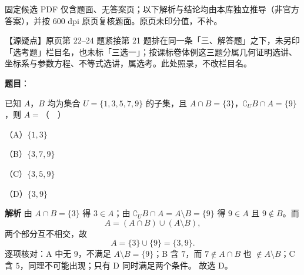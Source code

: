 \begin{gktip}
固定候选 PDF 仅含题面、无答案页；以下解析与结论均由本库独立推导（非官方答案），并按 600 dpi 原页复核题面。原页未印分值，不补。

【源疑点】原页第 22–24 题紧接第 21 题排在同一条「三、解答题」之下，未另印「选考题」栏目名，也未标「三选一」；按课标卷体例这三题分属几何证明选讲、坐标系与参数方程、不等式选讲，属选考。此处照录，不改栏目名。
\end{gktip}

\begin{answer}

\textbf{题目}：

已知 $A$，$B$ 均为集合 $U=\{1,3,5,7,9\}$ 的子集，且 $A\cap B=\{3\}$，$\complement_U B\cap A=\{9\}$，则 $A=$（　）

（A）$\{1,3\}$

（B）$\{3,7,9\}$

（C）$\{3,5,9\}$

（D）$\{3,9\}$

\textbf{解析}
由 $A\cap B=\{3\}$ 得 $3\in A$；由 $\complement_U B\cap A=A\setminus B=\{9\}$ 得 $9\in A$ 且 $9\notin B$。而
\nopagebreak[4]
\[A=(A\cap B)\cup(A\setminus B),\]
两个部分互不相交，故
\nopagebreak[4]
\[A=\{3\}\cup\{9\}=\{3,9\}.\]
逐项核对：A 中无 $9$，不满足 $A\setminus B=\{9\}$；B 含 $7$，而 $7\notin A\cap B$ 也 $\notin A\setminus B$；C 含 $5$，同理不可能出现；只有 D 同时满足两个条件。
故选 D。


\end{answer}
